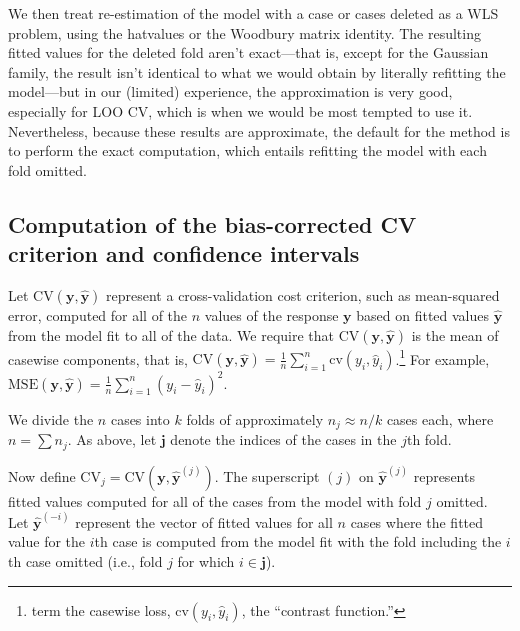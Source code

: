 \documentclass[
]{jss}
\begin{document}
We then treat re-estimation of the model with a case or cases deleted as
a WLS problem, using the hatvalues or the Woodbury matrix identity. The
resulting fitted values for the deleted fold aren't exact---that is,
except for the Gaussian family, the result isn't identical to what we
would obtain by literally refitting the model---but in our (limited)
experience, the approximation is very good, especially for LOO CV, which
is when we would be most tempted to use it. Nevertheless, because these
results are approximate, the default for the  
method is to perform the exact computation, which entails refitting the
model with each fold omitted.

\hypertarget{computation-of-the-bias-corrected-cv-criterion-and-confidence-intervals}{%
\subsection{Computation of the bias-corrected CV criterion and
confidence
intervals}\label{computation-of-the-bias-corrected-cv-criterion-and-confidence-intervals}}

Let \(\mathrm{CV}(\mathbf{y}, \widehat{\mathbf{y}})\) represent a
cross-validation cost criterion, such as mean-squared error, computed
for all of the \(n\) values of the response \(\mathbf{y}\) based on
fitted values \(\widehat{\mathbf{y}}\) from the model fit to all of the
data. We require that \(\mathrm{CV}(\mathbf{y}, \widehat{\mathbf{y}})\)
is the mean of casewise components, that is,
\(\mathrm{CV}(\mathbf{y}, \widehat{\mathbf{y}}) = \frac{1}{n}\sum_{i=1}^n\mathrm{cv}(y_i, \widehat{y}_i)\).\footnote{\citet{ArlotCelisse:2010}
  term the casewise loss, \(\mathrm{cv}(y_i, \widehat{y}_i)\), the
  ``contrast function.''} For example,
\(\mathrm{MSE}(\mathbf{y}, \widehat{\mathbf{y}}) = \frac{1}{n}\sum_{i=1}^n (y_i - \widehat{y}_i)^2\).

We divide the \(n\) cases into \(k\) folds of approximately
\(n_j \approx n/k\) cases each, where \(n = \sum n_j\). As above, let
\(\mathbf{j}\) denote the indices of the cases in the \(j\)th fold.

Now define
\(\mathrm{CV}_j = \mathrm{CV}(\mathbf{y}, \widehat{\mathbf{y}}^{(j)})\).
The superscript \((j)\) on \(\widehat{\mathbf{y}}^{(j)}\) represents
fitted values computed for all of the cases from the model with fold
\(j\) omitted. Let \(\widehat{\mathbf{y}}^{(-i)}\) represent the vector
of fitted values for all \(n\) cases where the fitted value for the
\(i\)th case is computed from the model fit with the fold including the
\(i\)th case omitted (i.e., fold \(j\) for which \(i \in \mathbf{j}\)).
\end{document}
